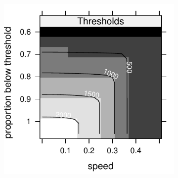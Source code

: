 \documentclass[12pt,english]{article}
\begin{document}
\begin{spacing}{1.9}
\begin{figure}[htbp]
\begin{subfigure}{.33\textwidth}
\includegraphics[width=1\textwidth]{plots/Threshold.pdf}
\end{subfigure}
\caption{
}
\label{management}
\end{figure}


\pagebreak


\end{spacing}
\end{document}
